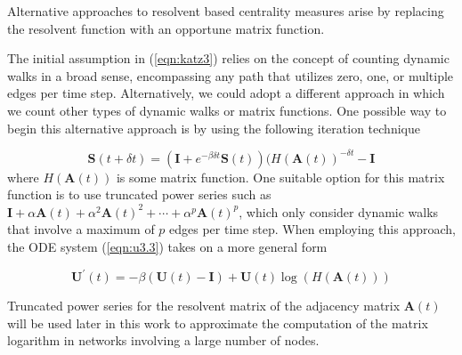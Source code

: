 \newpage

\begin{highlightedParagraphC}

Alternative approaches to resolvent based centrality measures arise by replacing the resolvent function with an opportune matrix function.
 

\end{highlightedParagraphC}

The initial assumption in (\ref{eqn:katz3}) relies on the concept of counting dynamic walks in a broad sense, encompassing any path that utilizes zero, one, or multiple edges per time step. Alternatively, we could adopt a different approach in which we count other types of dynamic walks or matrix functions. One possible way to begin this alternative approach is by using the following iteration technique

\begin{equation}
\label{eqn:remarks1}
    \mathbf{S}(t + \delta t) = (\mathbf{I} + e^{-\beta\delta t}\mathbf{S}(t)) (H(\mathbf{A}(t))^{-\delta t} - \mathbf{I}
\end{equation}
where $H(\mathbf{A}(t))$ is some matrix function. One suitable option for this matrix function is to use truncated power series such as $\mathbf{I} + \alpha \mathbf{A}(t) + \alpha^2 \mathbf{A}(t)^2 + \cdots + \alpha^p \mathbf{A}(t)^p$, which only consider dynamic walks that involve a maximum of $p$ edges per time step. When employing this approach, the ODE system (\ref{eqn:u3.3}) takes on a more general form 

\begin{equation}
\label{eqn:remarks2}
    \mathbf{U^{\prime}}(t) = -\beta (\mathbf{U}(t) - \mathbf{I}) + \mathbf{U}(t)\log (H(\mathbf{A}(t)))
\end{equation}

Truncated power series for the resolvent matrix of the adjacency matrix $\mathbf{A}(t)$ will be used later in this work to approximate the computation of the matrix logarithm in networks involving a large number of nodes.








